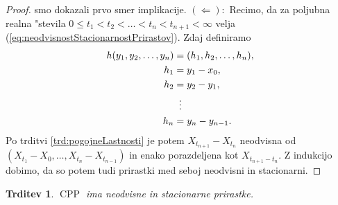 \documentclass[12pt, a4paper, reqno]{amsart}
\theoremstyle{definition}
\theoremstyle{plain}
\newtheorem{trditev}[definicija]{Trditev}
\newcommand{\1}{\mathds{1}}
\DeclareMathOperator{\CPP}{CPP}
\newcommand*{\refPriloga}[1]{%
  \begingroup
    \hypersetup{
      linkcolor=red,
      linkbordercolor=red,
    }%
    \ref{#1}%
  \endgroup
}
\begin{document}
\begin{proof}
            smo dokazali prvo smer implikacije. \newline
            \noindent
            $(\Leftarrow):$ Recimo, da za poljubna realna "stevila $0\leq t_1 < t_2 < \ldots < t_n < t_{n+1} < \infty$ velja
            (\ref{eq:neodvisnostStacionarnostPrirastov}). Zdaj definiramo 
            \begin{align*}
                h(y_1, y_2, \dots, y_n) &= (h_1, h_2, \dots, h_n),\\
                                    h_1 &= y_1 - x_0, \\
                                    h_2 &= y_2 - y_1, \\
                                    &\mathrel{\makebox[\widthof{=}]{\vdots}} \\
                                    h_n &= y_n - y_{n-1}. 
            \end{align*}  
            Po trditvi \refPriloga{trd:pogojneLastnosti} je potem $X_{t_{n+1}} - X_{t_n}$ neodvisna od
            $(X_{t_1} - X_0, \dots, X_{t_n} - X_{t_{n-1}})$ in enako porazdeljena kot $X_{t_{n+1} - t_n}$.
            Z indukcijo dobimo, da so potem tudi prirastki med seboj neodvisni in stacionarni.     
            
        \end{proof}

        \begin{trditev}
            $\CPP$ ima neodvisne in stacionarne prirastke.
            \label{trd:neodvPrirCPP}
        \end{trditev}
\end{document}
